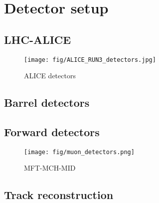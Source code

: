 \section{Detector setup}
    \subsection{LHC-ALICE}
    \begin{figure}[htbp]
        \centering
        \texttt{[image: fig/ALICE\_RUN3\_detectors.jpg]}
        \caption{ALICE detectors}
        \label{ALICE_detectors}
    \end{figure}
    \subsection{Barrel detectors}
    \subsection{Forward detectors}
    \begin{figure}[htbp]
        \centering
        \texttt{[image: fig/muon\_detectors.png]}
        \caption{MFT-MCH-MID}
        \label{muon_detectors}
    \end{figure}
    \subsection{Track reconstruction}
